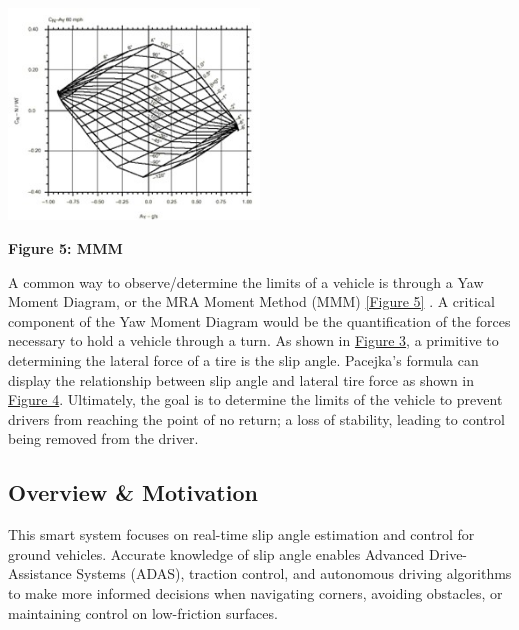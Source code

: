 \documentclass[12pt]{article}
\begin{document}
        \begin{center}
            \vspace{0.5cm}

            \includegraphics[width=0.5\textwidth]{resources/tn_MMM807.jpg}

            \vspace{0.5cm}

            \textbf{Figure 5: MMM} \autocite{Milliken_Research_Associates}
            \label{MMMa}
        
        \end{center}

        A common way to observe/determine the limits of a vehicle is through a Yaw Moment Diagram, or the MRA Moment Method 
        (MMM) \hyperref[MMMa]{[Figure 5]} \autocite{Milliken_Research_Associates}. A critical component of the Yaw Moment Diagram would be the quantification of the forces necessary to hold 
        a vehicle through a turn. As shown in  \hyperref[tire_deformation_2]{Figure 3}, a primitive to determining the lateral force of a tire is the slip angle. 
        Pacejka’s formula can display the relationship between slip angle and lateral tire force as shown in \hyperref[pjka]{Figure 4}. Ultimately, 
        the goal is to determine the limits of the vehicle to prevent drivers from reaching the point of no return; a loss of 
        stability, leading to control being removed from the driver.

        \subsection{Overview \& Motivation}
        
        This smart system focuses on real-time slip angle estimation and control for ground vehicles. Accurate knowledge of 
        slip angle enables Advanced Drive-Assistance Systems (ADAS), traction control, and autonomous driving algorithms to make 
        more informed decisions when navigating corners, avoiding obstacles, or maintaining control on low-friction surfaces. 
        
\end{document}
